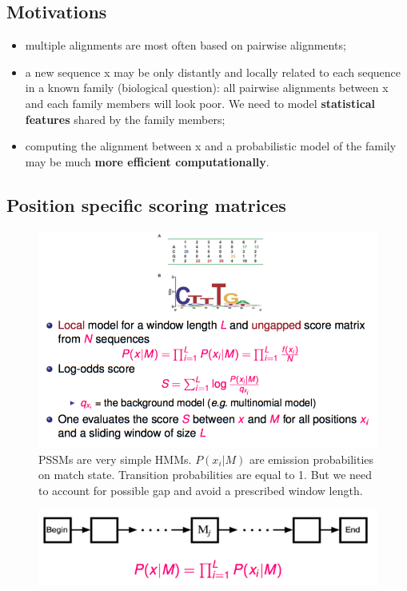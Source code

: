 
\subsection{Motivations}

\begin{itemize}
	\item multiple alignments are most often based on pairwise alignments;
	\item a new sequence x may be only distantly and locally related to each sequence in a known family (biological question): all pairwise alignments between x and each family members will look poor. We need to model \textbf{statistical features} shared by the family members;
	\item computing the alignment between x and a probabilistic model of the family may be much \textbf{more efficient computationally}.
\end{itemize}

\subsection{Position specific scoring matrices}

\begin{figure}[H]
	\centering
	\includegraphics[scale=0.5]{images/37_pssm.png}
	\caption{PSSMs are very simple HMMs. $P(x_i|M)$ are emission probabilities on match state. Transition probabilities are equal to 1. But we need to account for possible gap and avoid a prescribed window length.}
\end{figure}

\begin{figure}[H]
	\centering
	\includegraphics[scale=0.6]{images/40_pssm.png}
\end{figure}

